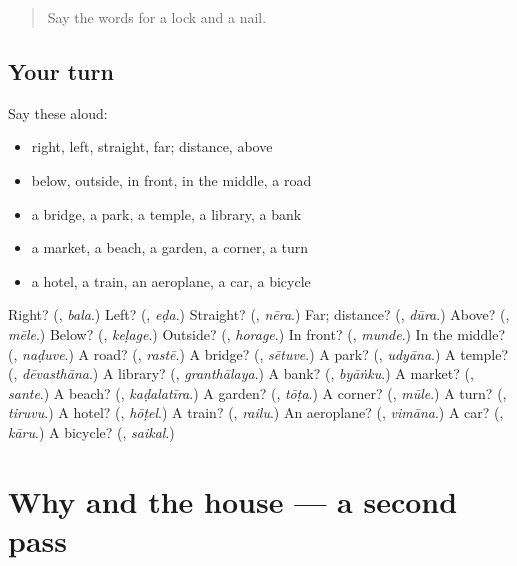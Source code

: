 \label{lesson:KA-R116-first-pass-places-can-and-want}



\begin{quote}
Say the words for a lock and a nail.
\end{quote}

\subsection*{Your turn}
Say these aloud:

\begin{itemize}
\raggedright
  \item right, left, straight, far; distance, above
  \item below, outside, in front, in the middle, a road
  \item a bridge, a park, a temple, a library, a bank
  \item a market, a beach, a garden, a corner, a turn
  \item a hotel, a train, an aeroplane, a car, a bicycle
\end{itemize}

\begin{tcolorbox}[breakable,colback=teal!4,colframe=teal!35!black,title={Before you move on}]
Right? (\textbf{}, \emph{bala}.) Left? (\textbf{}, \emph{eḍa}.) Straight? (\textbf{}, \emph{nēra}.) Far; distance? (\textbf{}, \emph{dūra}.) Above? (\textbf{}, \emph{mēle}.) Below? (\textbf{}, \emph{keḷage}.) Outside? (\textbf{}, \emph{horage}.) In front? (\textbf{}, \emph{munde}.) In the middle? (\textbf{}, \emph{naḍuve}.) A road? (\textbf{}, \emph{rastē}.) A bridge? (\textbf{}, \emph{sētuve}.) A park? (\textbf{}, \emph{udyāna}.) A temple? (\textbf{}, \emph{dēvasthāna}.) A library? (\textbf{}, \emph{granthālaya}.) A bank? (\textbf{}, \emph{byāṅku}.) A market? (\textbf{}, \emph{sante}.) A beach? (\textbf{}, \emph{kaḍalatīra}.) A garden? (\textbf{}, \emph{tōṭa}.) A corner? (\textbf{}, \emph{mūle}.) A turn? (\textbf{}, \emph{tiruvu}.) A hotel? (\textbf{}, \emph{hōṭel}.) A train? (\textbf{}, \emph{railu}.) An aeroplane? (\textbf{}, \emph{vimāna}.) A car? (\textbf{}, \emph{kāru}.) A bicycle? (\textbf{}, \emph{saikal}.)
\end{tcolorbox}
\section[(dialogue)]{Why and the house — a second pass}

